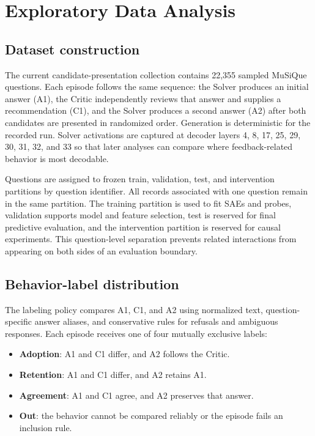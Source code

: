 \section{Exploratory Data Analysis}
\label{sec:eda}

\subsection{Dataset construction}

The current candidate-presentation collection contains 22,355 sampled MuSiQue
questions. Each episode follows the same sequence: the Solver produces an
initial answer (A1), the Critic independently reviews that answer and supplies
a recommendation (C1), and the Solver produces a second answer (A2) after both
candidates are presented in randomized order. Generation is deterministic for
the recorded run. Solver activations are captured at decoder layers 4, 8, 17,
25, 29, 30, 31, 32, and 33 so that later analyses can compare where
feedback-related behavior is most decodable.

Questions are assigned to frozen train, validation, test, and intervention
partitions by question identifier. All records associated with one question
remain in the same partition. The training partition is used to fit SAEs and
probes, validation supports model and feature selection, test is reserved for
final predictive evaluation, and the intervention partition is reserved for
causal experiments. This question-level separation prevents related
interactions from appearing on both sides of an evaluation boundary.

\subsection{Behavior-label distribution}

The labeling policy compares A1, C1, and A2 using normalized text,
question-specific answer aliases, and conservative rules for refusals and
ambiguous responses. Each episode receives one of four mutually exclusive
labels:

\begin{itemize}
    \item \textbf{Adoption}: A1 and C1 differ, and A2 follows the Critic.
    \item \textbf{Retention}: A1 and C1 differ, and A2 retains A1.
    \item \textbf{Agreement}: A1 and C1 agree, and A2 preserves that answer.
    \item \textbf{Out}: the behavior cannot be compared reliably or the
    episode fails an inclusion rule.
\end{itemize}

